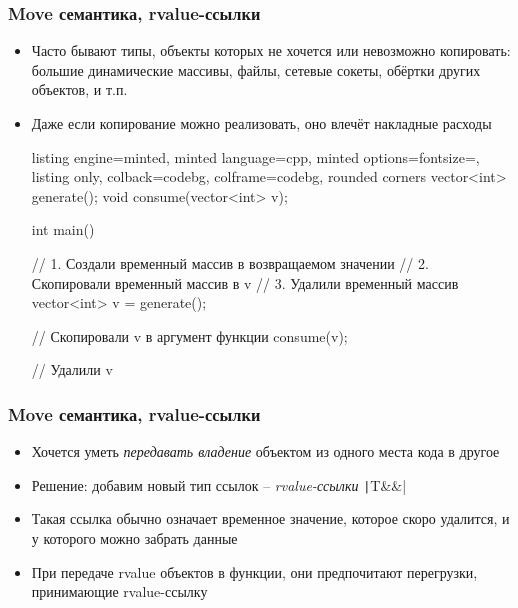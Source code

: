 \documentclass[10pt]{beamer}
\begin{document}
\begin{frame}[fragile]
\frametitle{Move семантика, rvalue-ссылки}
\begin{itemize}
\item Часто бывают типы, объекты которых не хочется или невозможно копировать: большие динамические массивы, файлы, сетевые сокеты, обёртки других объектов, и т.п.
\pause
\item Даже если копирование можно реализовать, оно влечёт накладные расходы
\pause
{}
\begin{tcblisting}{listing engine=minted, minted language=cpp, minted options={fontsize=\scriptsize}, listing only, colback=codebg, colframe=codebg, rounded corners}
vector<int> generate();
void consume(vector<int> v);

int main() {
  // 1. Создали временный массив в возвращаемом значении
  // 2. Скопировали временный массив в v
  // 3. Удалили временный массив
  vector<int> v = generate();

  // Скопировали v в аргумент функции
  consume(v);

  // Удалили v
}
\end{tcblisting}
\end{itemize}
\end{frame}

\begin{frame}[fragile]
\frametitle{Move семантика, rvalue-ссылки}
\begin{itemize}
\item Хочется уметь \textit{передавать владение} объектом из одного места кода в другое
\pause
\item Решение: добавим новый тип ссылок -- \textit{rvalue-ссылки} \texttt|T&&|
\pause
\item Такая ссылка обычно означает временное значение, которое скоро удалится, и у которого можно забрать данные
\pause
\item При передаче rvalue объектов в функции, они предпочитают перегрузки, принимающие rvalue-ссылку
\end{itemize}
\end{frame}
\end{document}
